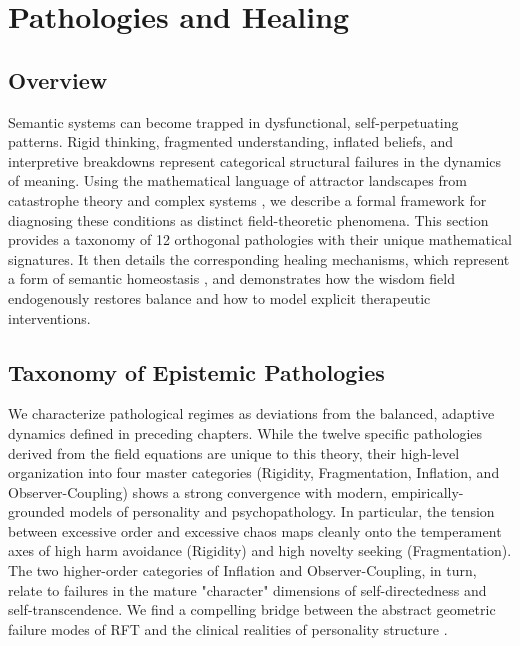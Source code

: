 \chapter{Pathologies and Healing}
\label{ch:pathologies_and_healing}


\section{Overview}

Semantic systems can become trapped in dysfunctional, self-perpetuating patterns. Rigid thinking, fragmented understanding, inflated beliefs, and interpretive breakdowns represent categorical structural failures in the dynamics of meaning. Using the mathematical language of attractor landscapes from catastrophe theory and complex systems \autocite{Thom1975, Zeeman1977, Milnor1985}, we describe a formal framework for diagnosing these conditions as distinct field-theoretic phenomena. This section provides a taxonomy of 12 orthogonal pathologies with their unique mathematical signatures. It then details the corresponding healing mechanisms, which represent a form of semantic homeostasis \autocite{Cannon1932}, and demonstrates how the wisdom field endogenously restores balance and how to model explicit therapeutic interventions.


\section{Taxonomy of Epistemic Pathologies}
\label{sec:taxonomy_of_epistemic_pathologies}

We characterize pathological regimes as deviations from the balanced, adaptive dynamics defined in preceding chapters. While the twelve specific pathologies derived from the field equations are unique to this theory, their high-level organization into four master categories (Rigidity, Fragmentation, Inflation, and Observer-Coupling) shows a strong convergence with modern, empirically-grounded models of personality and psychopathology. In particular, the tension between excessive order and excessive chaos maps cleanly onto the temperament axes of high harm avoidance (Rigidity) and high novelty seeking (Fragmentation). The two higher-order categories of Inflation and Observer-Coupling, in turn, relate to failures in the mature "character" dimensions of self-directedness and self-transcendence. We find a compelling bridge between the abstract geometric failure modes of RFT and the clinical realities of personality structure \autocite{Cloninger1993}.

